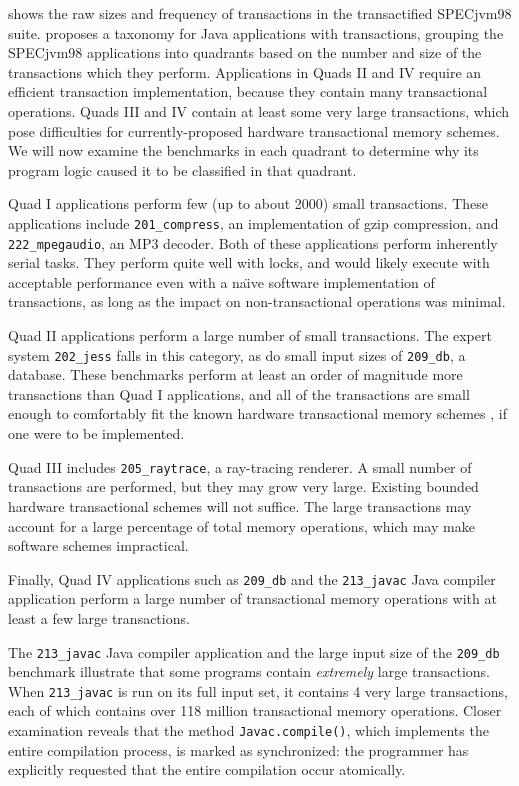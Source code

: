  shows the raw sizes and frequency of transactions in
the transactified SPECjvm98 suite.
 proposes a
taxonomy for Java applications with transactions, grouping the SPECjvm98
applications into quadrants based on the number and size of the
transactions which they perform.  Applications in Quads II and IV
require an efficient transaction implementation, because they contain
many transactional operations.
Quads III and IV contain at least some very large transactions, which
pose difficulties for currently-proposed hardware transactional memory
schemes.  We will now
examine the benchmarks in each quadrant to determine why its program
logic caused it to be classified in that quadrant.

Quad I applications perform few (up to about 2000) small
transactions.  These applications include \texttt{201\_compress}, an
implementation of gzip compression, and \texttt{222\_mpegaudio}, an
MP3 decoder.  Both of these applications perform inherently serial
tasks.  They perform quite well with locks, and would likely execute
with acceptable performance even with a na\"\i{}ve software
implementation of transactions, as long as the impact on
non-transactional operations was minimal.

Quad II applications perform a large number of small transactions.
The expert system \texttt{202\_jess} falls in this category, as do
small input sizes of \texttt{209\_db}, a database.  These benchmarks
perform at least an order of magnitude more transactions than Quad
I applications, and all of the transactions are small enough to 
comfortably fit the known hardware transactional memory schemes
\cite[etc]{HerlihyMo93}, if
one were to be implemented.

Quad III includes \texttt{205\_raytrace}, a ray-tracing renderer.  A
small number of transactions are performed, but they may grow very
large.  Existing bounded hardware transactional schemes will not
suffice.  The large
transactions may account for a large percentage of total memory
operations, which may make software schemes
impractical.

Finally, Quad IV applications such as \texttt{209\_db} and the
\texttt{213\_javac} Java compiler application perform a large number
of transactional memory operations with at least a few large transactions.  

The \texttt{213\_javac} Java compiler application and the large input
size of the \texttt{209\_db} benchmark illustrate that some programs
contain \emph{extremely} large transactions.  When \texttt{213\_javac}
is run on its full input set, it contains 4 very large transactions,
each of which contains over 118 million transactional memory
operations.  Closer
examination reveals that the method \texttt{Javac.compile()}, which
implements the entire compilation process, is marked as synchronized:
the programmer has explicitly requested that the entire compilation
occur atomically.

